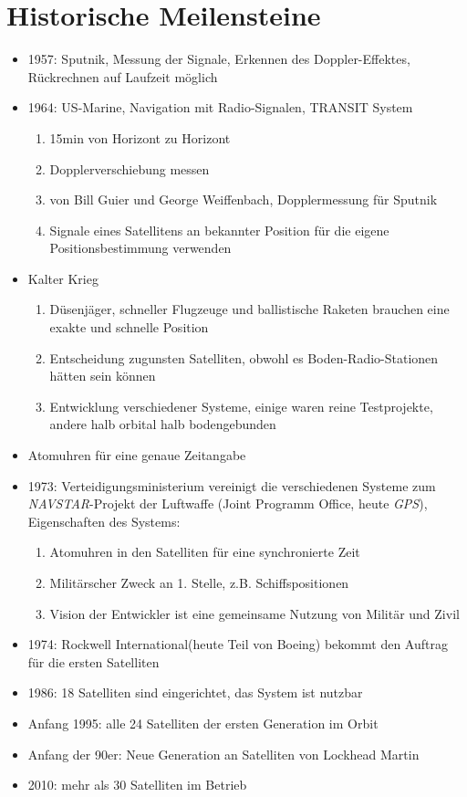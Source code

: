 \section{Historische Meilensteine}
\label{sec:historische-meilensteine}

\begin{itemize}
  \item 1957: Sputnik, Messung der Signale, Erkennen des Doppler-Effektes, Rückrechnen auf Laufzeit möglich
  \item 1964: US-Marine, Navigation mit Radio-Signalen, TRANSIT System
  \begin{enumerate}
      \item 15min von Horizont zu Horizont
      \item Dopplerverschiebung messen
      \item von Bill Guier und George Weiffenbach, Dopplermessung für Sputnik
      \item Signale eines Satellitens an bekannter Position für die eigene Positionsbestimmung verwenden
  \end{enumerate}
  \item Kalter Krieg
  \begin{enumerate}
      \item Düsenjäger, schneller Flugzeuge und ballistische Raketen brauchen eine exakte und schnelle Position
      \item Entscheidung zugunsten Satelliten, obwohl es Boden-Radio-Stationen hätten sein können
      \item Entwicklung verschiedener Systeme, einige waren reine Testprojekte, andere halb orbital halb bodengebunden
  \end{enumerate}
   \item Atomuhren für eine genaue Zeitangabe
   \item 1973: Verteidigungsministerium vereinigt die verschiedenen Systeme zum \\\textit{NAVSTAR}-Projekt der Luftwaffe (Joint Programm Office, heute \textit{GPS}),\\Eigenschaften des Systems:
   \begin{enumerate}
       \item Atomuhren in den Satelliten für eine synchronierte Zeit
       \item Militärscher Zweck an 1. Stelle, z.B. Schiffspositionen
       \item Vision der Entwickler ist eine gemeinsame Nutzung von Militär und Zivil
   \end{enumerate}
   \item 1974: Rockwell International(heute Teil von Boeing) bekommt den Auftrag für die ersten Satelliten
   \item 1986: 18 Satelliten sind eingerichtet, das System ist nutzbar
   \item Anfang 1995: alle 24 Satelliten der ersten Generation im Orbit
   \item Anfang der 90er: Neue Generation an Satelliten von Lockhead Martin
   \item 2010: mehr als 30 Satelliten im Betrieb
\end{itemize}
